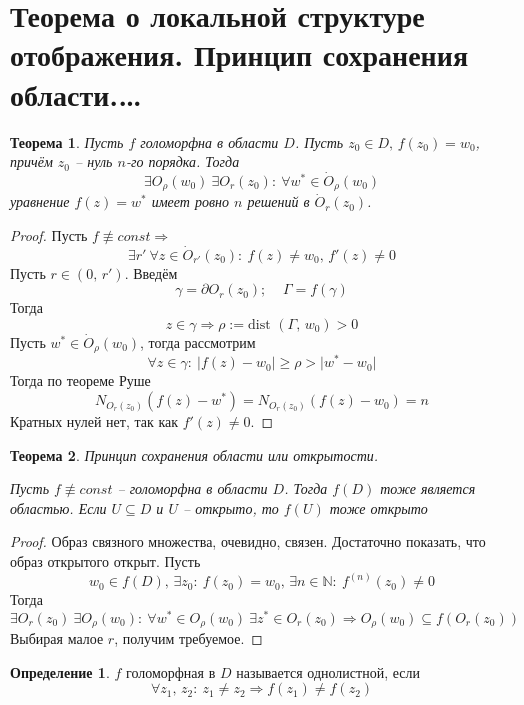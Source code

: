 \documentclass[a4paper,12pt]{article}
\renewcommand{\geq}{\ensuremath{\geqslant}}
\theoremstyle{plain}
\newtheorem{theorem}{Теорема}[section]
\theoremstyle{definition}
\newtheorem{definition}{Определение}[section]
\theoremstyle{remark}
\begin{document}
\section{Теорема о локальной структуре отображения. Принцип сохранения области.\dots}
\begin{theorem}
	Пусть $f$ голоморфна в области $D$. Пусть $z_0 \in D,\, f(z_0) = w_0$, причём $z_0$ -- нуль $n$-го порядка. Тогда
	\[
		\exists O_\rho(w_0) \: \exists O_r(z_0) :\: \forall w^* \in \dot{O}_\rho(w_0)
	\]
	уравнение $f(z) = w^*$ имеет ровно $n$ решений в $\dot{O}_r(z_0)$.
\end{theorem}

\begin{proof}
	Пусть $f \not\equiv const \Rightarrow$
	\[
		\exists r' \: \forall z \in \dot{O}_{r'}(z_0) :\: f(z) \neq w_0,\, f'(z) \neq 0
	\]
	Пусть $r \in (0,\,r')$. Введём
	\[
		\gamma = \partial O_r(z_0);\;\;\;\; \Gamma = f(\gamma)
	\]
	Тогда
	\[
		z \in \gamma \Rightarrow \rho := \text{dist }(\Gamma,\, w_0) > 0
	\]
	Пусть $w^* \in \dot{O}_\rho(w_0)$, тогда рассмотрим
	\[
		\forall z \in \gamma :\: \vert f(z) - w_0\vert \geq \rho > \vert w^* - w_0\vert
	\]
	Тогда по теореме Руше
	\[
		N_{O_r(z_0)}(f(z) - w^*) = N_{O_r(z_0)}(f(z) - w_0) = n
	\]
	Кратных нулей нет, так как $f'(z) \neq 0$.
\end{proof}

\begin{theorem}
	Принцип сохранения области или открытости.

	Пусть $f \not\equiv const$ -- голоморфна в области $D$. Тогда $f(D)$ тоже является областью. Если $U \subseteq D $ и $U$ -- открыто, то $f(U)$ тоже открыто
\end{theorem}

\begin{proof}
	Образ связного множества, очевидно, связен. Достаточно показать, что образ открытого открыт. Пусть
	\[
		w_0 \in f(D),\, \exists z_0 :\: f(z_0) = w_0,\, \exists n \in \mathbb{N} :\: f^{(n)}(z_0) \neq 0
	\]
	Тогда
	\[
		\exists O_r(z_0) \: \exists O_\rho(w_0) :\: \forall w^* \in O_\rho(w_0) \: \exists z^* \in O_r(z_0) \Rightarrow O_\rho(w_0) \subseteq f(O_r(z_0))
	\]
	Выбирая малое $r$, получим требуемое.
\end{proof}

\begin{definition}
	$f$ голоморфная в $D$ называется однолистной, если
	\[
		\forall z_1,\,z_2 :\: z_1 \neq z_2 \Rightarrow f(z_1) \neq f(z_2)
	\]
\end{definition}
\end{document}
